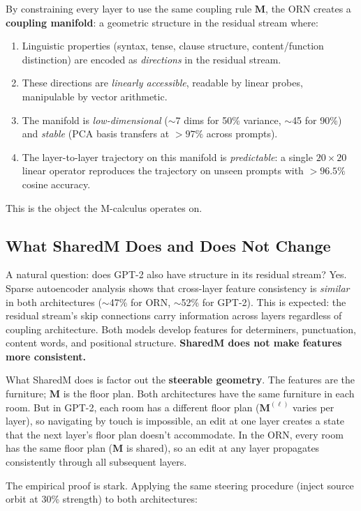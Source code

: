 \documentclass[11pt, a4paper]{article}
\newcommand{\M}{\mathbf{M}}
\theoremstyle{plain}
\theoremstyle{definition}
\theoremstyle{remark}
\begin{document}
By constraining every layer to use the same coupling rule $\M$, the ORN creates a \textbf{coupling manifold}: a geometric structure in the residual stream where:
\begin{enumerate}[nosep]
\item Linguistic properties (syntax, tense, clause structure, content/function distinction) are encoded as \emph{directions} in the residual stream.
\item These directions are \emph{linearly accessible}, readable by linear probes, manipulable by vector arithmetic.
\item The manifold is \emph{low-dimensional} ($\sim$7 dims for 50\% variance, $\sim$45 for 90\%) and \emph{stable} (PCA basis transfers at $>97\%$ across prompts).
\item The layer-to-layer trajectory on this manifold is \emph{predictable}: a single $20 \times 20$ linear operator reproduces the trajectory on unseen prompts with $>96.5\%$ cosine accuracy.
\end{enumerate}

This is the object the M-calculus operates on.

\subsection{What SharedM Does and Does Not Change}

A natural question: does GPT-2 also have structure in its residual stream?
Yes.
Sparse autoencoder analysis shows that cross-layer feature consistency is \emph{similar} in both architectures ($\sim$47\% for ORN, $\sim$52\% for GPT-2).
This is expected: the residual stream's skip connections carry information across layers regardless of coupling architecture.
Both models develop features for determiners, punctuation, content words, and positional structure.
\textbf{SharedM does not make features more consistent.}

What SharedM does is factor out the \textbf{steerable geometry}.
The features are the furniture; $\M$ is the floor plan.
Both architectures have the same furniture in each room.
But in GPT-2, each room has a different floor plan ($\M^{(\ell)}$ varies per layer), so navigating by touch is impossible, an edit at one layer creates a state that the next layer's floor plan doesn't accommodate.
In the ORN, every room has the same floor plan ($\M$ is shared), so an edit at any layer propagates consistently through all subsequent layers.

The empirical proof is stark.
Applying the same steering procedure (inject source orbit at 30\% strength) to both architectures:
\end{document}
